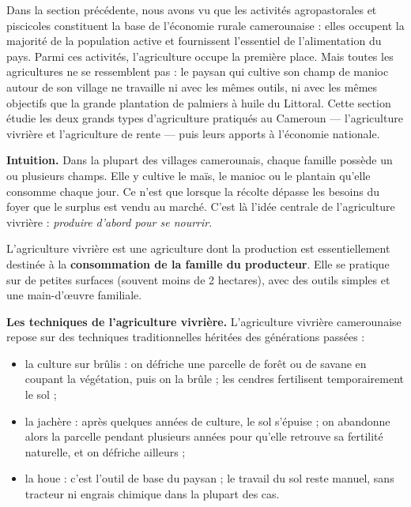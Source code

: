 \documentclass[11pt]{article}
\newcommand{\cle}[1]{{\popxbold\color{popdark}#1}}
\newcounter{popsec}
\newcounter{popsub}
\newcommand{\courssub}[1]{%
  \stepcounter{popsub}%
  \par\vspace{9pt}\noindent{\popxbold\fontsize{11.5}{13}\selectfont\color{popink}{\color{poporange}\thepopsec.\thepopsub}\hspace{6pt}#1}\par\nopagebreak\vspace{4pt}
}
\begin{document}
Dans la section précédente, nous avons vu que les activités agropastorales et piscicoles constituent la base de l'économie rurale camerounaise : elles occupent la majorité de la population active et fournissent l'essentiel de l'alimentation du pays. Parmi ces activités, l'\cle{agriculture} occupe la première place. Mais toutes les agricultures ne se ressemblent pas : le paysan qui cultive son champ de manioc autour de son village ne travaille ni avec les mêmes outils, ni avec les mêmes objectifs que la grande plantation de palmiers à huile du Littoral. Cette section étudie les deux grands types d'agriculture pratiqués au Cameroun — l'agriculture vivrière et l'agriculture de rente — puis leurs apports à l'économie nationale.

\courssub{L'agriculture vivrière}

\textbf{Intuition.} Dans la plupart des villages camerounais, chaque famille possède un ou plusieurs champs. Elle y cultive le maïs, le manioc ou le plantain qu'elle consomme chaque jour. Ce n'est que lorsque la récolte dépasse les besoins du foyer que le surplus est vendu au marché. C'est là l'idée centrale de l'agriculture vivrière : \emph{produire d'abord pour se nourrir}.

\begin{definition}
L'\cle{agriculture vivrière} est une agriculture dont la production est essentiellement destinée à la \textbf{consommation de la famille du producteur}. Elle se pratique sur de petites surfaces (souvent moins de 2 hectares), avec des outils simples et une main-d'œuvre familiale.
\end{definition}

\textbf{Les techniques de l'agriculture vivrière.} L'agriculture vivrière camerounaise repose sur des techniques traditionnelles héritées des générations passées :

\begin{itemize}
\item la \cle{culture sur brûlis} : on défriche une parcelle de forêt ou de savane en coupant la végétation, puis on la brûle ; les cendres fertilisent temporairement le sol ;
\item la \cle{jachère} : après quelques années de culture, le sol s'épuise ; on abandonne alors la parcelle pendant plusieurs années pour qu'elle retrouve sa fertilité naturelle, et on défriche ailleurs ;
\item la \cle{houe} : c'est l'outil de base du paysan ; le travail du sol reste manuel, sans tracteur ni engrais chimique dans la plupart des cas.
\end{itemize}
\end{document}
